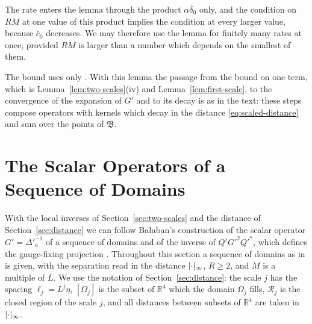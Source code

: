 \documentclass[11pt]{preprint}
\DeclarePairedDelimiter{\abs}{\lvert}{\rvert}
\numberwithin{equation}{section}
\theoremstyle{definition}
\theoremstyle{remark}
\theoremstyle{plain}
\begin{document}
The rate enters the lemma through the product $\alpha\bar\delta_0$ only, and the condition on $RM$ at one value of this product implies the condition at every larger value, because $\bar c_0$ decreases. We may therefore use the lemma for finitely many rates at once, provided $RM$ is larger than a number which depends on the smallest of them.

The bound \cite[(2.60)]{BalabanPRT2} uses only \cite[(2.57)]{BalabanPRT2}. With this lemma the passage from the bound \cite[(2.44)]{BalabanPRT2} on one term, which is Lemma~\ref{lem:two-scales}(iv) and Lemma~\ref{lem:first-scale}, to the convergence \cite[(2.49), (2.50)]{BalabanPRT2} of the expansion of $G'$ and to its decay \cite[(2.51)--(2.56), (2.64)]{BalabanPRT2} is as in the text: these steps compose operators with kernels which decay in the distance \eqref{eq:scaled-distance} and sum over the points of $\mathfrak B$.

\section{The Scalar Operators of a Sequence of Domains}\label{sec:sequence-scalar}

With the local inverses of Section~\ref{sec:two-scales} and the distance of Section~\ref{sec:distance} we can follow Ba{\l}aban's construction of the scalar operator $G' = \Delta'^{-1}_a$ of a sequence of domains and of the inverse of $Q'G'^2Q'^*$, which defines the gauge-fixing projection \cite[(2.37)--(2.88), pp.~229--238]{BalabanPRT2}. Throughout this section a sequence of domains as in \cite[(2.1), (2.2), p.~224]{BalabanPRT2} is given, with the separation read in the distance $\abs\cdot_\infty$, $R \geq 2$, and $M$ is a multiple of $L$. We use the notation of Section~\ref{sec:distance}: the scale $j$ has the spacing $\ell_j = L^j\eta$, $[\Omega_j]$ is the subset of $\mathbb R^4$ which the domain $\Omega_j$ fills, $\mathcal R_j$ is the closed region of the scale $j$, and all distances between subsets of $\mathbb R^4$ are taken in $\abs\cdot_\infty$.
\end{document}
